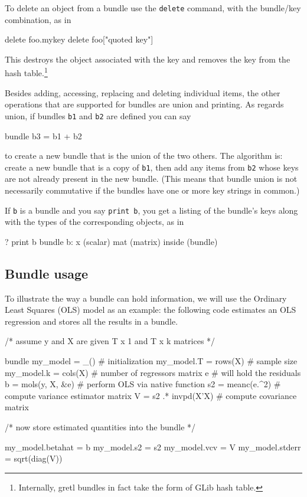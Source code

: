 To delete an object from a bundle use the \texttt{delete} command,
with the bundle/key combination, as in

\begin{code}
delete foo.mykey
delete foo["quoted key"]
\end{code}

This destroys the object associated with the key and removes the key
from the hash table.\footnote{Internally, gretl bundles in fact take
  the form of \textsf{GLib} hash table.}

Besides adding, accessing, replacing and deleting individual items,
the other operations that are supported for bundles are union and
printing. As regards union, if bundles \texttt{b1} and \texttt{b2} are
defined you can say

\begin{code}
bundle b3 = b1 + b2
\end{code}

to create a new bundle that is the union of the two others. The
algorithm is: create a new bundle that is a copy of \texttt{b1}, then
add any items from \texttt{b2} whose keys are not already present in
the new bundle. (This means that bundle union is not necessarily
commutative if the bundles have one or more key strings in common.)

If \texttt{b} is a bundle and you say \texttt{print b}, you get a
listing of the bundle's keys along with the types of the corresponding
objects, as in

\begin{code}
? print b
bundle b:
 x (scalar)
 mat (matrix)
 inside (bundle)
\end{code}

\subsection{Bundle usage}
\label{sec:bundle-usage}

To illustrate the way a bundle can hold information, we will use the
Ordinary Least Squares (OLS) model as an example: the following code
estimates an OLS regression and stores all the results in a bundle.

\begin{code}
/* assume y and X are given T x 1 and T x k matrices */

bundle my_model = _()           # initialization
my_model.T = rows(X)            # sample size
my_model.k = cols(X)            # number of regressors
matrix e                        # will hold the residuals
b = mols(y, X, &e)              # perform OLS via native function
s2 = meanc(e.^2)                # compute variance estimator
matrix V = s2 .* invpd(X'X)     # compute covariance matrix

/* now store estimated quantities into the bundle */

my_model.betahat = b
my_model.s2 = s2
my_model.vcv = V
my_model.stderr = sqrt(diag(V))
\end{code}

